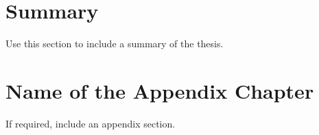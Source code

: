 \documentclass[a4paper, 12pt,  twoside,]{report}
\begin{document}
\clearpage

\newpage
\chapter{Summary}\label{chap:summary}

\renewcommand\thefigure{\thechapter.\arabic{figure}}    
\renewcommand{\theequation}{\thechapter.\arabic{equation}}
\setcounter{equation}{0}
\setcounter{figure}{0}

Use this section to include a summary of the thesis.


\newpage
\appendix


\chapter{Name of the Appendix Chapter}\label{app:appendix1}

\renewcommand\thefigure{\thechapter.\arabic{figure}}    
\renewcommand{\theequation}{\thechapter.\arabic{equation}}
\setcounter{equation}{0}
\setcounter{figure}{0}

If required, include an appendix section.


\clearpage

\newpage



\end{document}
